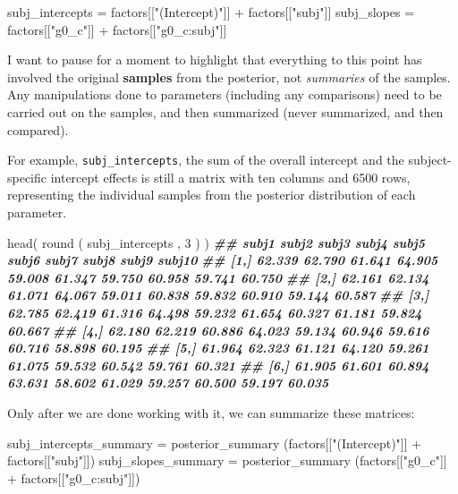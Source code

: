 \documentclass[
]{book}
\newenvironment{Shaded}{\begin{snugshade}}{\end{snugshade}}
\newcommand{\DecValTok}[1]{\textcolor[rgb]{0.00,0.00,0.81}{#1}}
\newcommand{\DocumentationTok}[1]{\textcolor[rgb]{0.56,0.35,0.01}{\textbf{\textit{#1}}}}
\newcommand{\FunctionTok}[1]{\textcolor[rgb]{0.00,0.00,0.00}{#1}}
\newcommand{\NormalTok}[1]{#1}
\newcommand{\OtherTok}[1]{\textcolor[rgb]{0.56,0.35,0.01}{#1}}
\newcommand{\SpecialCharTok}[1]{\textcolor[rgb]{0.00,0.00,0.00}{#1}}
\newcommand{\StringTok}[1]{\textcolor[rgb]{0.31,0.60,0.02}{#1}}
\begin{document}
\begin{Shaded}
\begin{Highlighting}[]
\NormalTok{subj\_intercepts }\OtherTok{=}\NormalTok{ factors[[}\StringTok{"(Intercept)"}\NormalTok{]] }\SpecialCharTok{+}\NormalTok{ factors[[}\StringTok{"subj"}\NormalTok{]]}
\NormalTok{subj\_slopes }\OtherTok{=}\NormalTok{ factors[[}\StringTok{"g0\_c"}\NormalTok{]] }\SpecialCharTok{+}\NormalTok{ factors[[}\StringTok{"g0\_c:subj"}\NormalTok{]]}
\end{Highlighting}
\end{Shaded}

I want to pause for a moment to highlight that everything to this point has involved the original \textbf{samples} from the posterior, not \emph{summaries} of the samples. Any manipulations done to parameters (including any comparisons) need to be carried out on the samples, and then summarized (never summarized, and then compared).

For example, \texttt{subj\_intercepts}, the sum of the overall intercept and the subject-specific intercept effects is still a matrix with ten columns and 6500 rows, representing the individual samples from the posterior distribution of each parameter.

\begin{Shaded}
\begin{Highlighting}[]
\FunctionTok{head}\NormalTok{( }\FunctionTok{round}\NormalTok{ ( subj\_intercepts , }\DecValTok{3}\NormalTok{ ) )}
\DocumentationTok{\#\#       subj1  subj2  subj3  subj4  subj5  subj6  subj7  subj8  subj9 subj10}
\DocumentationTok{\#\# [1,] 62.339 62.790 61.641 64.905 59.008 61.347 59.750 60.958 59.741 60.750}
\DocumentationTok{\#\# [2,] 62.161 62.134 61.071 64.067 59.011 60.838 59.832 60.910 59.144 60.587}
\DocumentationTok{\#\# [3,] 62.785 62.419 61.316 64.498 59.232 61.654 60.327 61.181 59.824 60.667}
\DocumentationTok{\#\# [4,] 62.180 62.219 60.886 64.023 59.134 60.946 59.616 60.716 58.898 60.195}
\DocumentationTok{\#\# [5,] 61.964 62.323 61.121 64.120 59.261 61.075 59.532 60.542 59.761 60.321}
\DocumentationTok{\#\# [6,] 61.905 61.601 60.894 63.631 58.602 61.029 59.257 60.500 59.197 60.035}
\end{Highlighting}
\end{Shaded}

Only after we are done working with it, we can summarize these matrices:

\begin{Shaded}
\begin{Highlighting}[]
\NormalTok{subj\_intercepts\_summary }\OtherTok{=} \FunctionTok{posterior\_summary}\NormalTok{ (factors[[}\StringTok{"(Intercept)"}\NormalTok{]] }\SpecialCharTok{+}\NormalTok{ factors[[}\StringTok{"subj"}\NormalTok{]])}
\NormalTok{subj\_slopes\_summary }\OtherTok{=} \FunctionTok{posterior\_summary}\NormalTok{ (factors[[}\StringTok{"g0\_c"}\NormalTok{]] }\SpecialCharTok{+}\NormalTok{ factors[[}\StringTok{"g0\_c:subj"}\NormalTok{]])}
\end{Highlighting}
\end{Shaded}
\end{document}
